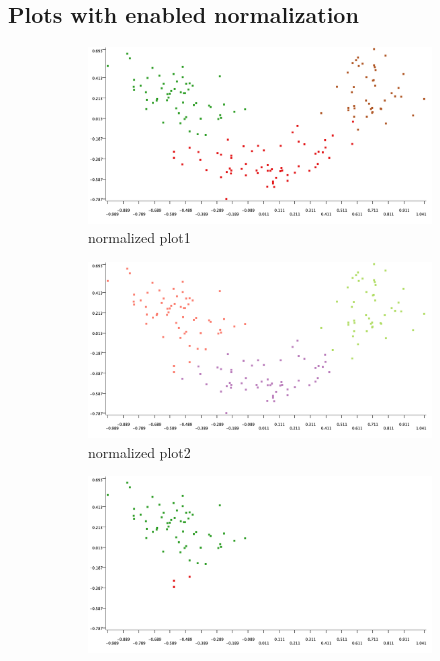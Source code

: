 \documentclass[11pt]{article}
\begin{document}
		\subsection*{Plots with enabled normalization}
			\iffalse
			\begin{figure}[H]
				\centering
				\begin{subfigure}{0.4\textwidth}
					\includegraphics[width=\textwidth]{res/t2/t24/t24-plot21}
					\caption{normalized plot1}
					\label{fig:first}
				\end{subfigure}
				\hfill
				\begin{subfigure}{0.4\textwidth}
					\includegraphics[width=\textwidth]{res/t2/t24/t24-plot22}
					\caption{normalized plot2}
					\label{fig:second}
				\end{subfigure}
				\hfill
				\begin{subfigure}{0.3\textwidth}
					\includegraphics[width=\textwidth]{res/t2/t24/t24-plot23a}

\end{subfigure}
\end{figure}
\end{document}
